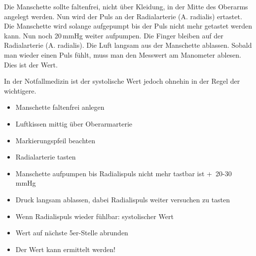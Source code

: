 \begin{figure}[H]
    \begin{center}
   
   

   
    \end{center}
\end{figure}


{
Die Manschette sollte faltenfrei, nicht über Kleidung, in der
Mitte des Oberarms angelegt werden. Nun wird der Puls an der
Radialarterie (A. radialis) ertastet. Die Manschette
wird solange aufgepumpt bis der Puls nicht mehr getastet werden
kann. Nun noch 20\,mmHg weiter aufpumpen. Die Finger bleiben
auf der Radialarterie (A. radialis). Die Luft langsam
aus der Manschette ablassen. Sobald man wieder einen Puls fühlt,
muss man den Messwert am Manometer ablesen. Dies ist der
 Wert. 

 In der
Notfallmedizin ist der systolische Wert jedoch ohnehin in der
Regel der wichtigere.
}{
\begin{itemize}
  \item Manschette faltenfrei anlegen
  \item Luftkissen  mittig über Oberarmarterie
  \item Markierungspfeil beachten
  \item Radialarterie tasten
  \item Manschette aufpumpen bis Radialispuls nicht mehr tastbar ist
  +~20-30\,mmHg
  \item Druck langsam ablassen, dabei Radialispuls weiter versuchen zu tasten
  \item Wenn Radialispuls wieder fühlbar: systolischer Wert
  \item Wert auf nächste 5er-Stelle abrunden
  \item Der  Wert kann  ermittelt werden!
\end{itemize}
}{}{}{}



